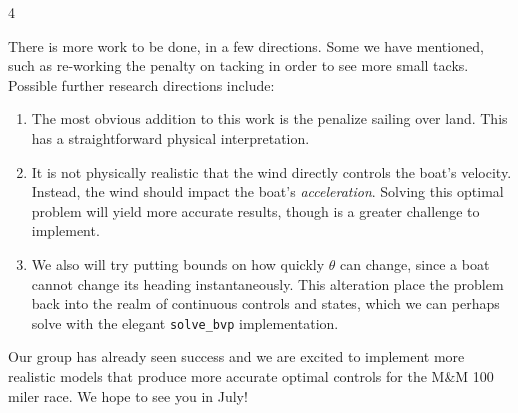 \documentclass[a0]{a0poster}
\newcommand{\NumColumns}{4}
\begin{document}
\begin{minipage}{\linewidth}
\begin{multicols*}{\NumColumns}
\vspace{1cm}


\large There is more work to be done, in a few directions. Some we have mentioned, such as re-working the penalty on tacking in order to see more small tacks. Possible further research directions include:

\begin{enumerate}
\item The most obvious addition to this work is the penalize sailing over land. This has a straightforward physical interpretation.
\item It is not physically realistic that the wind directly controls the boat's velocity. Instead, the wind should impact the boat's \textit{acceleration}. Solving this optimal problem will yield more accurate results, though is a greater challenge to implement.
\item We also will try putting bounds on how quickly $\theta$ can change, since a boat cannot change its heading instantaneously. This alteration place the problem back into the realm of continuous controls and states, which we can perhaps solve with the elegant \verb|solve_bvp| implementation.
\end{enumerate}

Our group has already seen success and we are excited to implement more realistic models that produce more accurate optimal controls for the M\&M 100 miler race. We hope to see you in July!



\end{multicols*}
\end{minipage}

\nocite{sunsail_racing_bvi}
\footnotesize
\end{document}

